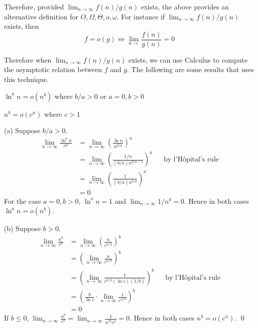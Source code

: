 Therefore,
provided
$\displaystyle\lim_{n \rightarrow \infty} f(n)/g(n)$
exists, the above provides an alternative definition
for $O, \Omega, \Theta, o, \omega$.
For instance if $\displaystyle\lim_{n \rightarrow \infty} f(n)/g(n)$ exists,
then
\[
f = o(g) \iff \lim_{n \rightarrow} \frac{f(n)}{g(n)} = 0
\]


Therefore when $\displaystyle \lim_{n \rightarrow \infty} f(n)/g(n)$ exists, we can use Calculus to compute the
asymptotic relation between $f$ and $g$.
The following are some results that uses this technique.

\begin{prop}
  \mbox{}
  \begin{myenum}
  \item $\ln^a n = o(n^b)$ where $b/a > 0$ or $a = 0, b > 0$
  \item $n^b = o(c^n)$ where $c > 1$
  \end{myenum}
\end{prop}
\proof
(a)
Suppose $b/a > 0$.
\begin{align*}
  \lim_{n \rightarrow \infty} \frac{\ln^a n}{n^b}
  &= \lim_{n \rightarrow \infty} \left( \frac{\ln n}{n^{b/a}} \right)^a\\
  &= \lim_{n \rightarrow \infty} \left( \frac{1/n}{(b/a)n^{b/a - 1}} \right)^a & & \text{by l'H\^opital's rule}\\
  &= \lim_{n \rightarrow \infty} \left( \frac{1}{(b/a)n^{b/a}} \right)^a\\
  &= 0
\end{align*}
For the case $a = 0, b > 0$, $\ln^a n = 1$ and
$\displaystyle \lim_{n \rightarrow \infty} 1/n^b = 0$.
Hence in both cases $\ln^a n = o(n^b)$.

(b)
Suppose $b > 0$.
\begin{align*}
  \lim_{n \rightarrow \infty} \frac{n^b}{c^n}
  &= \lim_{n \rightarrow \infty} \left( \frac{n}{c^{n/b}} \right)^b\\
  &= \left( \lim_{n \rightarrow \infty} \frac{n}{c^{n/b}} \right)^b\\
  &= \left( \lim_{n \rightarrow \infty} \frac{1}{c^{n/b}(\ln c)(1/b)} \right)^b & & \text{by l'H\^opital's rule}\\
  &= \left( \frac{b}{\ln c} \cdot \lim_{n \rightarrow \infty} \frac{1}{c^{n/b}} \right)^b\\
  &= 0
\end{align*}
If $b \leq 0$,
$\displaystyle\lim_{n \rightarrow \infty} \frac{n^b}{c^n} = \lim_{n \rightarrow \infty} \frac{1}{n^{|b|}c^n} = 0$.
Hence in both cases $n^b = o(c^n)$.
\qed

